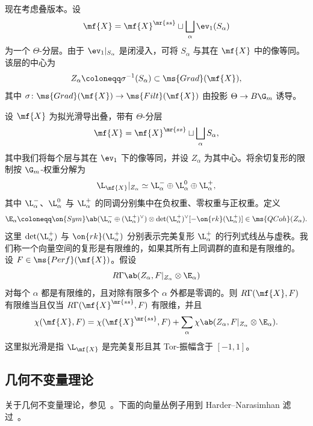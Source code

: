 现在考虑叠版本。设
\[
    \mf{X}
    =
    \mf{X}^{\mr{ss}}
    \sqcup
    \bigsqcup_\alpha\ev_1(S_\alpha)
\]
为一个 \(\Theta\)-分层。由于 \(\ev_1|_{S_\alpha}\) 是闭浸入，可将 \(S_\alpha\) 与其在 \(\mf{X}\) 中的像等同。该层的中心为
\[
    Z_\alpha\coloneqq\sigma^{-1}(S_\alpha)\subset\ms{Grad}(\mf{X}),
\]
其中 \(\sigma\colon\ms{Grad}(\mf{X})\to\ms{Filt}(\mf{X})\) 由投影 \(\Theta\to B\G_m\) 诱导。

\begin{thm}
    设 \(\mf{X}\) 为拟光滑导出叠，带有 \(\Theta\)-分层
    \[
        \mf{X}
        =
        \mf{X}^{\mr{ss}}
        \sqcup
        \bigsqcup_\alpha S_\alpha,
    \]
    其中我们将每个层与其在 \(\ev_1\) 下的像等同，并设 \(Z_\alpha\) 为其中心。将余切复形的限制按 \(\G_m\)-权重分解为
    \[
        \L_{\mf{X}}|_{Z_\alpha}
        \simeq
        \L_\alpha^-
        \oplus
        \L_\alpha^0
        \oplus
        \L_\alpha^+,
    \]
    其中 \(\L_\alpha^-\)、\(\L_\alpha^0\) 与 \(\L_\alpha^+\) 的同调分别集中在负权重、零权重与正权重。定义
    \[
        \E_\alpha
        \coloneqq
        \on{Sym}\ab(
            \L_\alpha^-
            \oplus
            (\L_\alpha^+)^\vee
        )
        \otimes
        \det(\L_\alpha^+)^\vee
        [-\on{rk}(\L_\alpha^+)]
        \in
        \ms{QCoh}(Z_\alpha).
    \]
    这里 \(\det(\L_\alpha^+)\) 与 \(\on{rk}(\L_\alpha^+)\) 分别表示完美复形 \(\L_\alpha^+\) 的行列式线丛与虚秩。我们称一个向量空间的复形是有限维的，如果其所有上同调群的直和是有限维的。
    设 \(F\in\ms{Perf}(\mf{X})\)。假设
    \[
        R\Gamma\ab(
            Z_\alpha,
            F|_{Z_\alpha}\otimes\E_\alpha
        )
    \]
    对每个 \(\alpha\) 都是有限维的，且对除有限多个 \(\alpha\) 外都是零调的。则 \(R\Gamma(\mf{X},F)\) 有限维当且仅当 \(R\Gamma(\mf{X}^{\mr{ss}},F)\) 有限维，并且
    \[
        \chi(\mf{X},F)
        =
        \chi(\mf{X}^{\mr{ss}},F)
        +
        \sum_\alpha
        \chi\ab(
            Z_\alpha,
            F|_{Z_\alpha}\otimes\E_\alpha
        ).
    \]
    这里拟光滑是指 \(\L_{\mf{X}}\) 是完美复形且其 Tor-振幅含于 \([-1,1]\)。
\end{thm}


\subsection{几何不变量理论}%
\label{sub:Geometric invariant theory}

关于几何不变量理论，参见~\cite{MFK1994}。下面的向量丛例子用到 Harder--Narasimhan 滤过~\cite{HN1975}。

